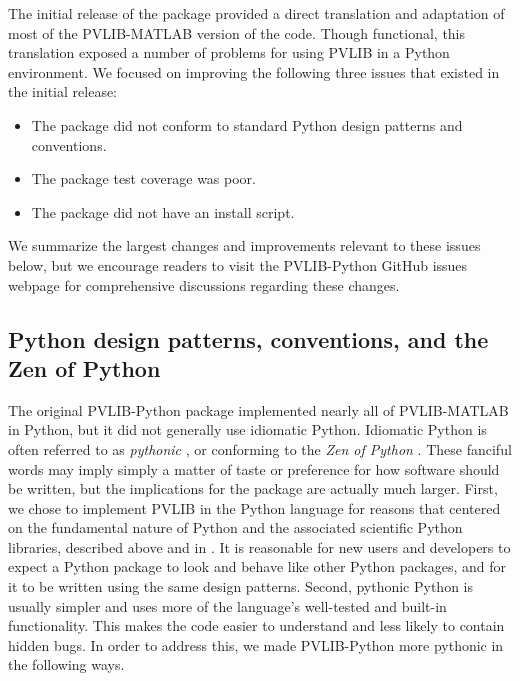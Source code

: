 \documentclass[conference]{IEEEtran}
\begin{document}
The initial release of the package provided a direct translation and adaptation of most of the PVLIB-MATLAB version of the code.
Though functional, this translation exposed a number of problems for using PVLIB in a Python environment.
We focused on improving the following three issues that existed in the initial release:

\begin{itemize}
\item The package did not conform to standard Python design patterns and conventions.
\item The package test coverage was poor. 
\item The package did not have an install script.
\end{itemize}

We summarize the largest changes and improvements relevant to these issues below, but we encourage readers to visit the PVLIB-Python GitHub issues webpage for comprehensive discussions regarding these changes.


\subsection{Python design patterns, conventions, and the Zen of Python}

The original PVLIB-Python package implemented nearly all of PVLIB-MATLAB in Python, but it did not generally use idiomatic Python.
Idiomatic Python is often referred to as \emph{pythonic} \cite{pythonic}, or conforming to the \emph{Zen of Python} \cite{zenofpython}. 
These fanciful words may imply simply a matter of taste or preference for how software should be written, but the implications for the package are actually much larger.
First, we chose to implement PVLIB in the Python language for reasons that centered on the fundamental nature of Python and the associated scientific Python libraries, described above and in \cite{andrews}. 
It is reasonable for new users and developers to expect a Python package to look and behave like other Python packages, and for it to be written using the same design patterns.
Second, pythonic Python is usually simpler and uses more of the language's well-tested and built-in functionality.
This makes the code easier to understand and less likely to contain hidden bugs.
In order to address this, we made PVLIB-Python more pythonic in the following ways.
\end{document}
